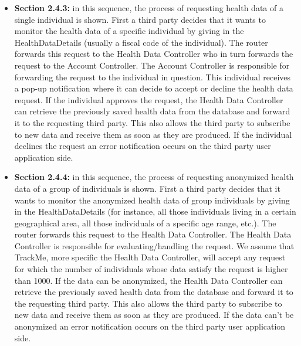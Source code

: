\documentclass[12pt]{article}
\begin{document}
\begin{itemize}
    \item \textbf{Section 2.4.3:} in this sequence, the process of requesting health data of a single individual is shown. First a third party decides that it wants to monitor the health data of a specific individual by giving in the HealthDataDetails (usually a fiscal code of the individual). The router forwards this request to the Health Data Controller who in turn forwards the request to the Account Controller. The Account Controller is responsible for forwarding the request to the individual in question. This individual receives a pop-up notification where it can decide to accept or decline the health data request. If the individual approves the request, the Health Data Controller can retrieve the previously saved health data from the database and forward it to the requesting third party. This also allows the third party to subscribe to new data and receive them as soon as they are produced. If the individual declines the request an error notification occurs on the third party user application side.
    \newpage
    \item \textbf{Section 2.4.4:} in this sequence, the process of requesting anonymized health data of a group of individuals is shown. First a third party decides that it wants to monitor the anonymized health data of group individuals by giving in the HealthDataDetails (for instance, all those individuals living in a certain geographical area, all those individuals of a specific age range, etc.). The router forwards this request to the Health Data Controller. The Health Data Controller is responsible for evaluating/handling the request. We assume that TrackMe, more specific the Health Data Controller, will accept any request for which the number of individuals whose data satisfy the request is higher than 1000. If the data can be anonymized, the Health Data Controller can retrieve the previously saved health data from the database and forward it to the requesting third party. This also allows the third party to subscribe to new data and receive them as soon as they are produced. If the data can't be anonymized an error notification occurs on the third party user application side.


\end{itemize}
\end{document}
